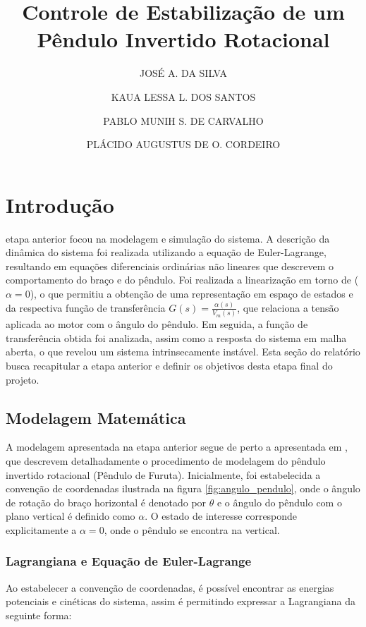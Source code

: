\documentclass[9pt,a4paper,twocolumn,twoside]{tau-class/tau}
\title{Controle de Estabilização de um Pêndulo Invertido Rotacional}
\author[a,1]{JOSÉ A. DA SILVA}
\author[b,2]{KAUA LESSA L. DOS SANTOS }
\author[c,3]{PABLO MUNIH S. DE CARVALHO}
\author[d,4]{PLÁCIDO AUGUSTUS DE O. CORDEIRO}
\affil[a]{Engenharia da Computação, Universidade Federal de Alagoas}
\affil[b]{Engenharia da Computação, Universidade Federal de Alagoas}
\affil[c]{Engenharia da Computação, Universidade Federal de Alagoas}
\begin{document}
		
    \maketitle 
    \thispagestyle{firststyle} 
    \tauabstract 
    

\section{Introdução}
     etapa anterior focou na modelagem e simulação do sistema. A descrição da dinâmica do sistema foi realizada 
    utilizando a equação de Euler-Lagrange, resultando em equações diferenciais ordinárias não lineares que descrevem o
    comportamento do braço e do pêndulo. Foi realizada a linearização em torno de (\(\alpha = 0\)), o que permitiu a
    obtenção de uma representação em espaço de estados e da respectiva função de transferência \(G(s) = \frac{\alpha(s)}{V_m(s)}\),
    que relaciona a tensão aplicada ao motor com o ângulo do pêndulo. Em seguida, a função de transferência obtida foi
    analizada, assim como a resposta do sistema em malha aberta, o que revelou um sistema intrinsecamente instável. Esta seção do 
    relatório busca recapitular a etapa anterior e definir os objetivos desta etapa final do projeto. 

    \subsection{Modelagem Matemática}
    
    A modelagem apresentada na etapa anterior segue de perto a apresentada em \cite{ramos2011rotary}, que descrevem detalhadamente o
    procedimento de modelagem do pêndulo invertido rotacional (Pêndulo de Furuta). Inicialmente, foi estabelecida a convenção de coordenadas
    ilustrada na figura \ref{fig:angulo_pendulo}, onde o ângulo de rotação do braço horizontal é denotado por \(\theta\) e o ângulo do pêndulo com o plano vertical é
    definido como \(\alpha\). O estado de interesse corresponde explicitamente a \(\alpha = 0\), onde o pêndulo se encontra na vertical.

    \subsubsection*{Lagrangiana e Equação de Euler-Lagrange}
    Ao estabelecer a convenção de coordenadas, é possível encontrar as energias potenciais e cinéticas do sistema, assim é permitindo 
    expressar a Lagrangiana da seguinte forma:
\end{document}
